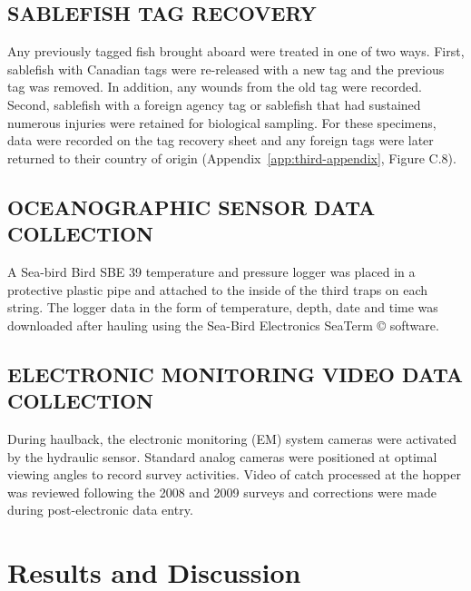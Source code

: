 \documentclass[12pt]{article}\usepackage[]{graphicx}\usepackage[]{color}
\begin{document}
\hypertarget{sablefish-tag-recovery}{%
\subsection{SABLEFISH TAG RECOVERY}\label{sablefish-tag-recovery}}

Any previously tagged fish brought aboard were treated in one of two ways. First, sablefish with Canadian tags were re-released with a new tag and the previous tag was removed. In addition, any wounds from the old tag were recorded. Second, sablefish with a foreign agency tag or sablefish that had sustained numerous injuries were retained for biological sampling. For these specimens, data were recorded on the tag recovery sheet and any foreign tags were later returned to their country of origin (Appendix~\ref{app:third-appendix}, Figure C.8).

\hypertarget{oceanographic-sensor-data-collection}{%
\subsection{OCEANOGRAPHIC SENSOR DATA COLLECTION}\label{oceanographic-sensor-data-collection}}

A Sea-bird Bird SBE 39 temperature and pressure logger was placed in a protective plastic pipe and attached to the inside of the third traps on each string. The logger data in the form of temperature, depth, date and time was downloaded after hauling using the Sea-Bird Electronics SeaTerm © software.

\hypertarget{electronic-monitoring-video-data-collection}{%
\subsection{ELECTRONIC MONITORING VIDEO DATA COLLECTION}\label{electronic-monitoring-video-data-collection}}

During haulback, the electronic monitoring (EM) system cameras were activated by the hydraulic sensor. Standard analog cameras were positioned at optimal viewing angles to record survey activities. Video of catch processed at the hopper was reviewed following the 2008 and 2009 surveys and corrections were made during post-electronic data entry.

\clearpage

\hypertarget{results-and-discussion}{%
\section{Results and Discussion}\label{results-and-discussion}}
\end{document}
